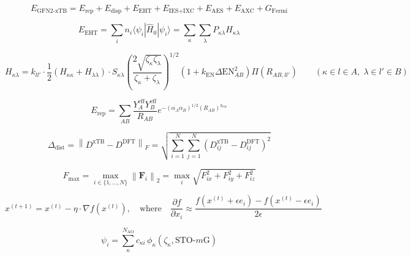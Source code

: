 \documentclass{article}
\begin{document}
\begin{equation*}
    E_{\text{GFN2-xTB}} = E_{\text{rep}} + E_{\text{disp}} + E_{\text{EHT}} + E_{\text{IES+IXC}} + E_{\text{AES}} + E_{\text{AXC}} + G_{\text{Fermi}}
\end{equation*}

\begin{equation*}
    E_{\mathrm{EHT}} = \sum_i n_i \langle \psi_i | \hat{H}_0 | \psi_i \rangle
    = \sum_{\kappa} \sum_{\lambda} P_{\kappa \lambda} H_{\kappa \lambda}
\end{equation*}

\begin{equation*}
    H_{\kappa\lambda} = k_{ll'} \cdot \frac{1}{2}(H_{\kappa\kappa} + H_{\lambda\lambda}) \cdot S_{\kappa\lambda}
    \left( \frac{2 \sqrt{\zeta_\kappa \zeta_\lambda}}{\zeta_\kappa + \zeta_\lambda} \right)^{1/2}
    \left( 1 + k_{\mathrm{EN}} \Delta \mathrm{EN}_{AB}^2 \right) \Pi(R_{AB,ll'})
    \qquad (\kappa \in l \in A, \; \lambda \in l' \in B)
\end{equation*}

\begin{equation*}
    E_{\mathrm{rep}} = \sum_{AB}
    \frac{Y_A^{\mathrm{eff}} Y_B^{\mathrm{eff}}}{R_{AB}}
    e^{ -\left( \alpha_A \alpha_B \right)^{1/2} (R_{AB})^{k_{\mathrm{rep}}} }
\end{equation*}

\begin{equation*}
    \Delta_{\text{dist}} = \left\| D^{\text{xTB}} - D^{\text{DFT}} \right\|_F
    = \sqrt{ \sum_{i=1}^{N} \sum_{j=1}^{N} \left( D_{ij}^{\text{xTB}} - D_{ij}^{\text{DFT}} \right)^2 }
\end{equation*}

\begin{equation*}
    F_{\text{max}} = \max_{i \in \{1, \ldots, N\}} \left\| \mathbf{F}_i \right\|_2
    = \max_{i} \sqrt{F_{ix}^2 + F_{iy}^2 + F_{iz}^2}
\end{equation*}


\begin{equation*}
    x^{(t+1)} = x^{(t)} - \eta \cdot \nabla f(x^{(t)}), \quad \text{where} \quad
    \frac{\partial f}{\partial x_i} \approx \frac{f(x^{(t)} + \epsilon e_i) - f(x^{(t)} - \epsilon e_i)}{2\epsilon}
\end{equation*}

\begin{equation*}
    \psi_i = \sum_{\kappa}^{N_{\text{AO}}} c_{\kappa i} \, \phi_{\kappa}(\zeta_{\kappa}, \text{STO-}m\text{G})
\end{equation*}
\end{document}
